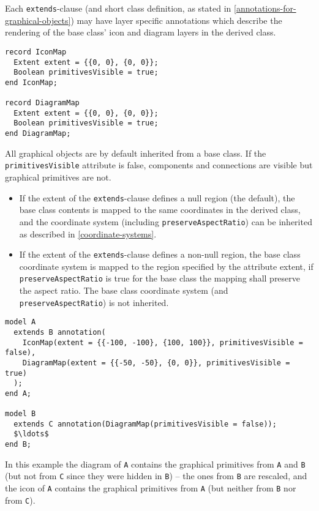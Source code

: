 Each \lstinline!extends!-clause (and short class definition, as stated in \cref{annotations-for-graphical-objects}) may have layer specific annotations which describe the rendering of the base class' icon and diagram layers in the derived class.

\begin{lstlisting}[language=modelica]
record IconMap
  Extent extent = {{0, 0}, {0, 0}};
  Boolean primitivesVisible = true;
end IconMap;

record DiagramMap
  Extent extent = {{0, 0}, {0, 0}};
  Boolean primitivesVisible = true;
end DiagramMap;
\end{lstlisting}%
All graphical objects are by default inherited from a base class.
If the \lstinline!primitivesVisible! attribute is false, components and connections are visible but graphical primitives are not.

\begin{itemize}
\item
  If the extent of the \lstinline!extends!-clause defines a null region (the default), the base class contents is mapped to the same coordinates in the derived class, and the coordinate system (including \lstinline!preserveAspectRatio!) can be inherited as described in \cref{coordinate-systems}.
\item
  If the extent of the \lstinline!extends!-clause defines a non-null region, the base class coordinate system is mapped to the region specified by the attribute extent, if \lstinline!preserveAspectRatio! is true for the base class the mapping shall preserve the aspect ratio.
  The base class coordinate system (and \lstinline!preserveAspectRatio!) is not inherited.
\end{itemize}

\begin{example}
\begin{lstlisting}[language=modelica]
model A
  extends B annotation(
    IconMap(extent = {{-100, -100}, {100, 100}}, primitivesVisible = false),
    DiagramMap(extent = {{-50, -50}, {0, 0}}, primitivesVisible = true)
  );
end A;

model B
  extends C annotation(DiagramMap(primitivesVisible = false));
  $\ldots$
end B;
\end{lstlisting}
In this example the diagram of \lstinline!A! contains the graphical primitives
from \lstinline!A! and \lstinline!B! (but not from \lstinline!C! since they were hidden in \lstinline!B!) -- the ones
from \lstinline!B! are rescaled, and the icon of \lstinline!A! contains the graphical primitives
from \lstinline!A! (but neither from \lstinline!B! nor from \lstinline!C!).
\end{example}

